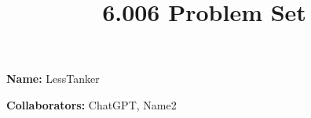 \documentclass[12pt,twoside]{article}
\title{6.006 Problem Set \theproblemsetnum}
\newcommand{\theproblemsetnum}{3}
\begin{document}

\setlength{\parindent}{0pt}
\medskip\hrulefill\medskip

{\bf Name:} LessTanker

\medskip

{\bf Collaborators:} ChatGPT, Name2

\medskip\hrulefill






\end{document}
